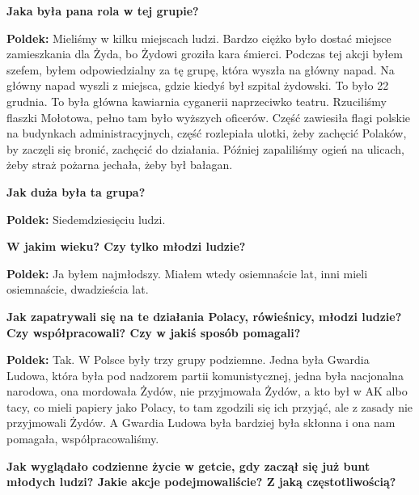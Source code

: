 \begin{otherlanguage}{polish}
\textbf{Jaka była pana rola w tej grupie?}

\textbf{Poldek:} Mieliśmy w kilku miejscach ludzi. Bardzo ciężko było dostać miejsce zamieszkania dla Żyda, bo Żydowi groziła kara śmierci. Podczas tej akcji byłem szefem, byłem odpowiedzialny za tę grupę, która wyszła na główny napad. Na główny napad wyszli z miejsca, gdzie kiedyś był szpital żydowski. To było 22 grudnia. To była główna kawiarnia cyganerii naprzeciwko teatru. Rzuciliśmy flaszki Mołotowa, pełno tam było wyższych oficerów. Część zawiesiła flagi polskie na budynkach administracyjnych, część rozlepiała ulotki, żeby zachęcić Polaków, by zaczęli się bronić, zachęcić do działania. Później zapaliliśmy ogień na ulicach, żeby straż pożarna jechała, żeby był bałagan.
 
\textbf{Jak duża była ta grupa?}

\textbf{Poldek:} Siedemdziesięciu ludzi.

\textbf{W jakim wieku? Czy tylko młodzi ludzie?}
 
\textbf{Poldek:} Ja byłem najmłodszy. Miałem wtedy osiemnaście lat, inni mieli osiemnaście, dwadzieścia lat.

\textbf{Jak zapatrywali się na te działania Polacy, rówieśnicy, młodzi ludzie? Czy współpracowali? Czy w jakiś sposób pomagali?}

\textbf{Poldek:}  Tak. W Polsce były trzy grupy podziemne. Jedna była Gwardia Ludowa, która była pod nadzorem partii komunistycznej, jedna była nacjonalna narodowa, ona mordowała Żydów, nie przyjmowała Żydów, a kto był w AK albo tacy, co mieli papiery jako Polacy, to tam zgodzili się ich przyjąć, ale z zasady nie przyjmowali Żydów. A Gwardia Ludowa była bardziej była skłonna i ona nam pomagała, współpracowaliśmy.
 
\textbf{Jak wyglądało codzienne życie w getcie, gdy zaczął się już bunt młodych ludzi? Jakie akcje podejmowaliście? Z jaką częstotliwością?}
   

\end{otherlanguage}

